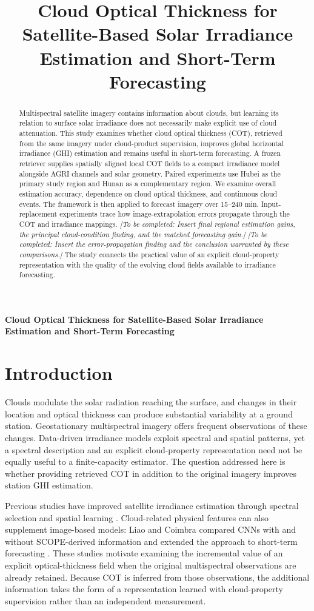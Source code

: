 \documentclass[11pt]{article}
\title{Cloud Optical Thickness for Satellite-Based Solar Irradiance Estimation and Short-Term Forecasting}
\author{}\date{}
\newcommand{\pending}[1]{\textit{[To be completed: #1]}}
\begin{document}
\begin{center}\LARGE\bfseries
Cloud Optical Thickness for Satellite-Based Solar Irradiance Estimation and Short-Term Forecasting
\end{center}
\begin{abstract}
Multispectral satellite imagery contains information about clouds, but learning its relation to surface solar irradiance does not necessarily make explicit use of cloud attenuation. This study examines whether cloud optical thickness (COT), retrieved from the same imagery under cloud-product supervision, improves global horizontal irradiance (GHI) estimation and remains useful in short-term forecasting. A frozen retriever supplies spatially aligned local COT fields to a compact irradiance model alongside AGRI channels and solar geometry. Paired experiments use Hubei as the primary study region and Hunan as a complementary region. We examine overall estimation accuracy, dependence on cloud optical thickness, and continuous cloud events. The framework is then applied to forecast imagery over 15--240 min. Input-replacement experiments trace how image-extrapolation errors propagate through the COT and irradiance mappings. \pending{Insert final regional estimation gains, the principal cloud-condition finding, and the matched forecasting gain.} \pending{Insert the error-propagation finding and the conclusion warranted by these comparisons.} The study connects the practical value of an explicit cloud-property representation with the quality of the evolving cloud fields available to irradiance forecasting.
\end{abstract}

\section{Introduction}
Clouds modulate the solar radiation reaching the surface, and changes in their location and optical thickness can produce substantial variability at a ground station. Geostationary multispectral imagery offers frequent observations of these changes. Data-driven irradiance models exploit spectral and spatial patterns, yet a spectral description and an explicit cloud-property representation need not be equally useful to a finite-capacity estimator. The question addressed here is whether providing retrieved COT in addition to the original imagery improves station GHI estimation.

Previous studies have improved satellite irradiance estimation through spectral selection and spatial learning \cite{chen2023}. Cloud-related physical features can also supplement image-based models: Liao and Coimbra compared CNNs with and without SCOPE-derived information and extended the approach to short-term forecasting \cite{liao2024}. These studies motivate examining the incremental value of an explicit optical-thickness field when the original multispectral observations are already retained. Because COT is inferred from those observations, the additional information takes the form of a representation learned with cloud-property supervision rather than an independent measurement.
\end{document}
